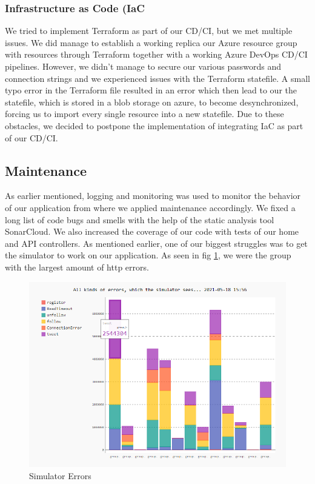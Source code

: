 \documentclass{article}
\begin{document}
    \subsubsection{Infrastructure as Code (IaC}
    We tried to implement Terraform as part of our CD/CI, but we met multiple issues. We did manage to establish a working replica our Azure resource group with resources through Terraform together with a working Azure DevOps CD/CI pipelines. However, we didn't manage to secure our various passwords and connection strings and we experienced issues with the Terraform statefile. A small typo error in the Terraform file resulted in an error which then lead to our the statefile, which is stored in a blob storage on azure, to become desynchronized, forcing us to import every single resource into a new statefile. Due to these obstacles, we decided to postpone the implementation of integrating IaC as part of our CD/CI. 
        

\subsection{Maintenance}
As earlier mentioned, logging and monitoring was used to monitor the behavior of our application from where we applied maintenance accordingly. We fixed a long list of code bugs and smells with the help of the static analysis tool SonarCloud. We also increased the coverage of our code with tests of our home and API controllers.  
As mentioned earlier, one of our biggest struggles was to get the simulator to work on our application. As seen in fig \ref{fig:sim}, we were the group with the largest amount of http errors. 

\begin{figure}[H]
\centering
\includegraphics[width=1\textwidth]{images/simulatorerr.png}
\caption{\label{fig:sim} Simulator Errors}
\end{figure}
\end{document}
